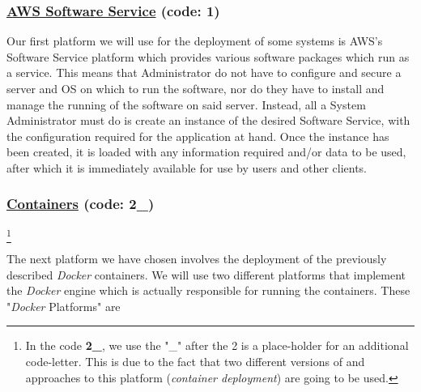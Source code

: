 \documentclass{article}[12pt]
\numberwithin{equation}{section}
\begin{document}
\begin{flushleft}
\subsubsection{\underline{AWS Software Service} (code: \textbf{1})}
\begin{spacing}{1.5}
	Our first platform we will use for the deployment of some systems is AWS's Software Service platform which provides various software packages which run as a service.  This means that Administrator do not have to configure and secure a server and OS on which to run the software, nor do they have to install and manage the running of the software on said server.  Instead, all a System Administrator must do is create an instance of the desired Software Service, with the configuration required for the application at hand.  Once the instance has been created, it is loaded with any information required and/or data to be used, after which it is immediately available for use by users and other clients. 
\end{spacing}


\subsubsection{\underline{Containers} (code: \textbf{2\_})}\footnote{In the code \textbf{2\_}, we use the "\_" after the 2 is a place-holder for an additional code-letter.  This is due to the fact that two different versions of and approaches to this platform (\emph{container deployment}) are going to be used.}
\begin{spacing}{1.5}
	The next platform we have chosen involves the deployment of the previously described \emph{Docker} containers.  We will use two different platforms that implement the \emph{Docker} engine which is actually responsible for running the containers.  These "\emph{Docker} Platforms" are
	

\end{spacing}
\end{flushleft}
\end{document}
